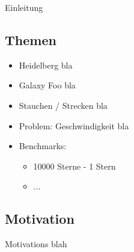 Einleitung

\subsection{Themen}

\begin{itemize}
  \item Heidelberg bla
  \item Galaxy Foo bla
  \item Stauchen / Strecken bla
  \item Problem: Geschwindigkeit bla
  \item Benchmarks:
  \begin{itemize}
    \item 10000 Sterne - 1 Stern
    \item ...
  \end{itemize}
\end{itemize}

\subsection{Motivation}

Motivations blah
